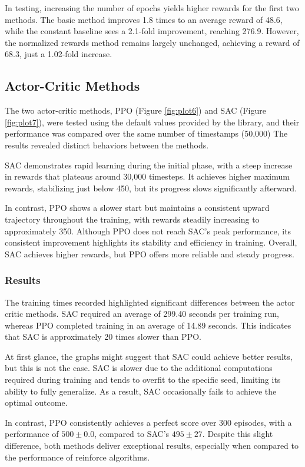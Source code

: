 \documentclass{article}
\begin{document}
In testing, increasing the number of epochs yields higher rewards for the first two methods. The basic method improves 1.8 times to an average reward of 48.6, while the constant baseline sees a 2.1-fold improvement, reaching 276.9. However, the normalized rewards method remains largely unchanged, achieving a reward of 68.3, just a 1.02-fold increase.


\subsection{Actor-Critic Methods}
The two actor-critic methods, PPO (Figure \ref{fig:plot6}) and SAC (Figure \ref{fig:plot7}), were tested using the default values provided by the library, and their performance was compared over the same number of timestamps (50,000) The results revealed distinct behaviors between the methods. 

SAC demonstrates rapid learning during the initial phase, with a steep increase in rewards that plateaus around 30,000 timesteps. It achieves higher maximum rewards, stabilizing just below 450, but its progress slows significantly afterward. 

In contrast, PPO shows a slower start but maintains a consistent upward trajectory throughout the training, with rewards steadily increasing to approximately 350. Although PPO does not reach SAC’s peak performance, its consistent improvement highlights its stability and efficiency in training. Overall, SAC achieves higher rewards, but PPO offers more reliable and steady progress.

\subsubsection{Results}
The training times recorded highlighted significant differences between the actor critic methods. SAC required an average of 299.40 seconds per training run, whereas PPO completed training in an average of 14.89 seconds. This indicates that SAC is approximately 20 times slower than PPO. 

At first glance, the graphs might suggest that SAC could achieve better results, but this is not the case. SAC is slower due to the additional computations required during training and tends to overfit to the specific seed, limiting its ability to fully generalize. As a result, SAC occasionally fails to achieve the optimal outcome.

In contrast, PPO consistently achieves a perfect score over 300 episodes, with a performance of $ 500 \pm 0.0 $, compared to SAC’s $495 \pm 27$. Despite this slight difference, both methods deliver exceptional results, especially when compared to the performance of reinforce algorithms.
\end{document}
